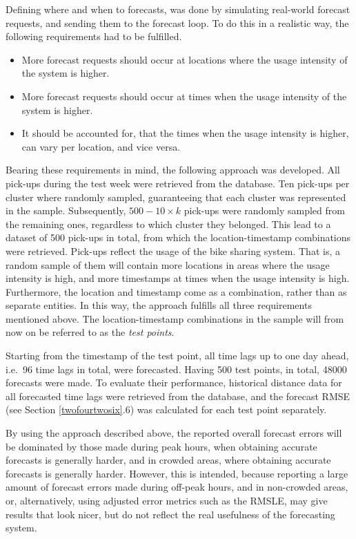 \documentclass[12pt,oneside]{reedthesis}
\providecommand{\tightlist}{%
  \setlength{\itemsep}{0pt}\setlength{\parskip}{0pt}}
\begin{document}
Defining where and when to forecasts, was done by simulating real-world
forecast requests, and sending them to the forecast loop. To do this in
a realistic way, the following requirements had to be fulfilled.
\begin{itemize}
\tightlist
\item
  More forecast requests should occur at locations where the usage
  intensity of the system is higher.
\item
  More forecast requests should occur at times when the usage intensity
  of the system is higher.
\item
  It should be accounted for, that the times when the usage intensity is
  higher, can vary per location, and vice versa.
\end{itemize}
Bearing these requirements in mind, the following approach was
developed. All pick-ups during the test week were retrieved from the
database. Ten pick-ups per cluster where randomly sampled, guaranteeing
that each cluster was represented in the sample. Subsequently,
\(500-10 \times k\) pick-ups were randomly sampled from the remaining
ones, regardless to which cluster they belonged. This lead to a dataset
of 500 pick-ups in total, from which the location-timestamp combinations
were retrieved. Pick-ups reflect the usage of the bike sharing system.
That is, a random sample of them will contain more locations in areas
where the usage intensity is high, and more timestamps at times when the
usage intensity is high. Furthermore, the location and timestamp come as
a combination, rather than as separate entities. In this way, the
approach fulfills all three requirements mentioned above. The
location-timestamp combinations in the sample will from now on be
referred to as the \emph{test points}.

Starting from the timestamp of the test point, all time lags up to one
day ahead, i.e.~96 time lags in total, were forecasted. Having 500 test
points, in total, 48000 forecasts were made. To evaluate their
performance, historical distance data for all forecasted time lags were
retrieved from the database, and the forecast RMSE (see Section
\ref{twofourtwosix}.6) was calculated for each test point separately.

By using the approach described above, the reported overall forecast
errors will be dominated by those made during peak hours, when obtaining
accurate forecasts is generally harder, and in crowded areas, where
obtaining accurate forecasts is generally harder. However, this is
intended, because reporting a large amount of forecast errors made
during off-peak hours, and in non-crowded areas, or, alternatively,
using adjusted error metrics such as the RMSLE, may give results that
look nicer, but do not reflect the real usefulness of the forecasting
system.
\end{document}
